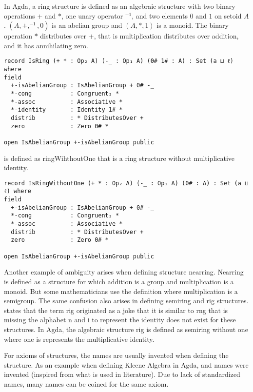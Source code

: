 In Agda, a ring structure is defined as an algebraic structure with two binary
operations $+$ and $*$, one unary operator $^{-1}$, and two elements $0$ and $1$
on setoid $A$. $(A,+,^{-1},0)$ is an abelian group and $(A,*,1)$ is a monoid.
The binary operation $*$ distributes over $+$, that is multiplication
distributes over addition, and it has annihilating zero.

\begin{verbatim}
record IsRing (+ * : Op₂ A) (-_ : Op₁ A) (0# 1# : A) : Set (a ⊔ ℓ) where
field
  +-isAbelianGroup : IsAbelianGroup + 0# -_
  *-cong           : Congruent₂ *
  *-assoc          : Associative *
  *-identity       : Identity 1# *
  distrib          : * DistributesOver +
  zero             : Zero 0# *

open IsAbelianGroup +-isAbelianGroup public
\end{verbatim} 
 is defined as ringWihthoutOne that is a ring structure without
multiplicative identity.
\begin{verbatim}
record IsRingWithoutOne (+ * : Op₂ A) (-_ : Op₁ A) (0# : A) : Set (a ⊔ ℓ) where
field
  +-isAbelianGroup : IsAbelianGroup + 0# -_
  *-cong           : Congruent₂ *
  *-assoc          : Associative *
  distrib          : * DistributesOver +
  zero             : Zero 0# *

open IsAbelianGroup +-isAbelianGroup public
\end{verbatim}

Another example of ambiguity arises when defining structure nearring. Nearring
is defined as a structure for which addition is a group and multiplication is a
monoid. But some mathematicians use the definition where multiplication is a
semigroup. The same confusion also arises in defining semiring and rig
structures. \cite{enwiki:1133737666} states that the term rig originated as a
joke that it is similar to rng that is missing the alphabet n and i to represent
the identity does not exist for these structures. In Agda, the algebraic
structure rig is defined as semiring without one where one is represents the
multiplicative identity.

For axioms of structures, the names are usually invented when defining the
structure. As an example when defining Kleene Algebra in Agda,
 and  names were invented
(inspired from what is used in literature). Due to lack of standardized names,
many names can be coined for the same axiom.

